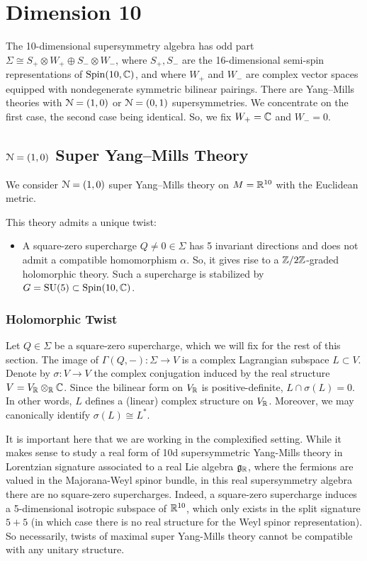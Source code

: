 \documentclass[10pt, oneside]{article}
\begin{document}
\section{Dimension 10}

The 10-dimensional supersymmetry algebra has odd part $\Sigma\cong S_+\otimes W_+\oplus S_-\otimes W_-$, where $S_+, S_-$ are the 16-dimensional semi-spin representations of $\mathrm{Spin}(10, \mathbb C)$, and where $W_+$ and $W_-$ are complex vector spaces equipped with nondegenerate symmetric bilinear pairings. There are Yang--Mills theories with $\mathcal N=(1, 0)$ or $\mathcal N=(0, 1)$ supersymmetries. We concentrate on the first case, the second case being identical. So, we fix $W_+=\mathbb C$ and $W_- = 0$.

\subsection{\texorpdfstring{$\mathcal N=(1, 0)$}{N=(1,0)} Super Yang--Mills Theory}

We consider $\mathcal N=(1, 0)$ super Yang--Mills theory on $M=\mathbb R^{10}$ with the Euclidean metric.

This theory admits a unique twist:
\begin{itemize}
\item A square-zero supercharge $Q\neq 0\in\Sigma$ has 5 invariant directions and does not admit a compatible homomorphism $\alpha$. So, it gives rise to a $\mathbb Z/2\mathbb Z$-graded holomorphic theory. Such a supercharge is stabilized by $G=\mathrm{SU}(5)\subset \mathrm{Spin}(10, \mathbb C)$.
\end{itemize}

\subsubsection{Holomorphic Twist}
\label{sect:10dholomorphictwist}

Let $Q\in\Sigma$ be a square-zero supercharge, which we will fix for the rest of this section. 
The image of $\Gamma(Q, -)\colon \Sigma\rightarrow V$ is a complex Lagrangian subspace $L\subset V$. Denote by $\sigma\colon V\rightarrow V$ the complex conjugation induced by the real structure $V = V_\mathbb R\otimes_\mathbb R\mathbb C$. Since the bilinear form on $V_\mathbb R$ is positive-definite, $L\cap \sigma(L) = 0$. In other words, $L$ defines a (linear) complex structure on $V_\mathbb R$. Moreover, we may canonically identify $\sigma(L)\cong L^*$.

\begin{remark}
It is important here that we are working in the complexified setting.  While it makes sense to study a real form of 10d supersymmetric Yang-Mills theory in Lorentzian signature associated to a real Lie algebra $\mathfrak{g}_\mathbb R$, where the fermions are valued in the Majorana-Weyl spinor bundle, in this real supersymmetry algebra there are no square-zero supercharges. Indeed, a square-zero supercharge induces a 5-dimensional isotropic subspace of $\mathbb R^{10}$, which only exists in the split signature $5+5$ (in which case there is no real structure for the Weyl spinor representation).  So necessarily, twists of maximal super Yang-Mills theory cannot be compatible with any unitary structure.
\end{remark}
\end{document}
